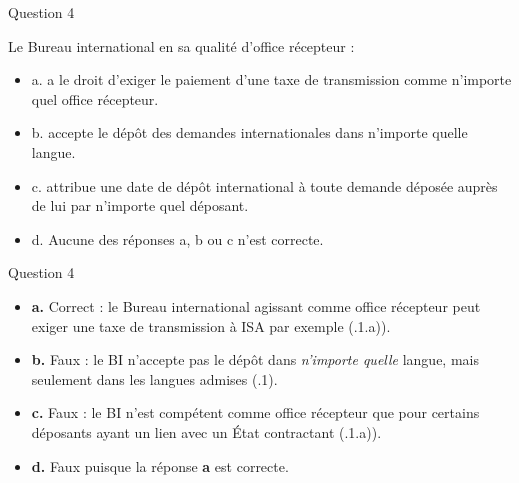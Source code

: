 \begin{frame}{Question 4}

\begin{block}{}
Le Bureau international en sa qualité d’office récepteur :

\begin{itemize}
  \item[$\bullet$] a. a le droit d’exiger le paiement d’une taxe de transmission comme n’importe quel 
  office récepteur. 
  \item[$\circ$] b. accepte le dépôt des demandes internationales dans n’importe quelle langue. 
  \item[$\circ$] c. attribue une date de dépôt international à toute demande déposée auprès de lui par 
  n’importe quel déposant. 
  \item[$\circ$] d. Aucune des réponses a, b ou c n’est correcte.
\end{itemize}

\end{block}

\end{frame}

\begin{frame}{Question 4}

\begin{itemize}
  \item[$\bullet$] \textbf{a.} \; Correct : le Bureau international agissant comme office récepteur
  peut exiger une taxe de transmission à ISA par exemple
  (.1.a)).

  \item[$\circ$] \textbf{b.} \; Faux : le BI n’accepte pas le dépôt dans \emph{n’importe quelle} langue,
  mais seulement dans les langues admises
  (.1).

  \item[$\circ$] \textbf{c.} \; Faux : le BI n’est compétent comme office récepteur que pour certains
  déposants ayant un lien avec un État contractant
  (.1.a)).

  \item[$\circ$] \textbf{d.} \; Faux puisque la réponse \textbf{a} est correcte.
\end{itemize}

\end{frame}

